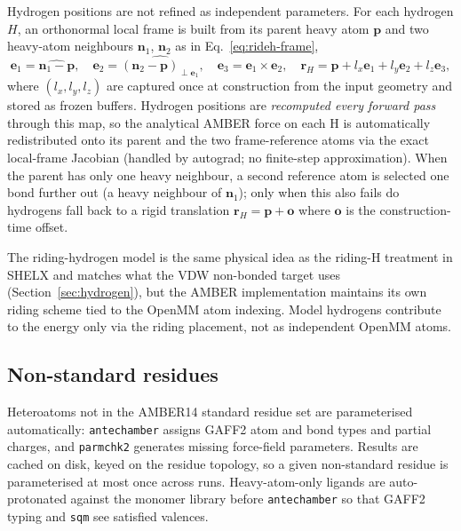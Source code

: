 \documentclass{iucrjournals}
\begin{document}
Hydrogen positions are not refined as independent parameters.  For each
hydrogen $H$, an orthonormal local frame is built from its parent heavy
atom $\mathbf{p}$ and two heavy-atom neighbours $\mathbf{n}_{1}$,
$\mathbf{n}_{2}$ as in Eq.~\ref{eq:rideh-frame},
%
\begin{equation}
  \mathbf{e}_{1} = \widehat{\mathbf{n}_{1} - \mathbf{p}},\quad
  \mathbf{e}_{2} = \widehat{(\mathbf{n}_{2} - \mathbf{p})_{\perp \mathbf{e}_{1}}},\quad
  \mathbf{e}_{3} = \mathbf{e}_{1} \times \mathbf{e}_{2},\quad
  \mathbf{r}_{H} = \mathbf{p} + l_{x}\mathbf{e}_{1} + l_{y}\mathbf{e}_{2}
                              + l_{z}\mathbf{e}_{3},
  \label{eq:rideh-frame}
\end{equation}
%
where $(l_{x}, l_{y}, l_{z})$ are captured once at construction from the
input geometry and stored as frozen buffers.  Hydrogen positions are
\emph{recomputed every forward pass} through this map, so the analytical
AMBER force on each H is automatically redistributed onto its parent and
the two frame-reference atoms via the exact local-frame Jacobian (handled
by autograd; no finite-step approximation). When the parent has only one
heavy neighbour, a second reference atom is selected one bond further out
(a heavy neighbour of $\mathbf{n}_{1}$); only when this also fails do
hydrogens fall back to a rigid translation
$\mathbf{r}_{H} = \mathbf{p} + \mathbf{o}$ where $\mathbf{o}$ is the
construction-time offset.

The riding-hydrogen model is the same physical idea as the riding-H
treatment in SHELX \cite{sheldrick_crystal_2015} and matches what the
VDW non-bonded target uses (Section~\ref{sec:hydrogen}), but the AMBER
implementation maintains its own riding scheme tied to the OpenMM atom
indexing.  Model hydrogens contribute to the energy only via the riding
placement, not as independent OpenMM atoms.

\subsection{Non-standard residues}

Heteroatoms not in the AMBER14 standard residue set are parameterised
automatically: \texttt{antechamber} \cite{wang_antechamber_2006} assigns
GAFF2 atom and bond types and partial charges, and \texttt{parmchk2}
generates missing force-field parameters.  Results are cached on disk,
keyed on the residue topology, so a given non-standard residue is
parameterised at most once across runs.  Heavy-atom-only
ligands are auto-protonated against the monomer library before
\texttt{antechamber} so that GAFF2 typing and \texttt{sqm} see satisfied
valences.
\end{document}
